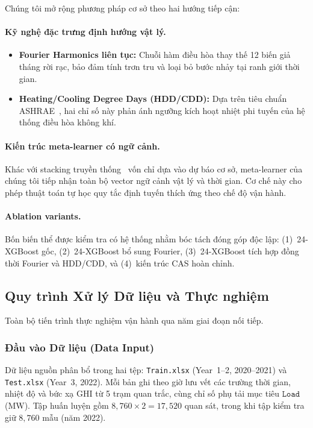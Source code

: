 Chúng tôi mở rộng phương pháp cơ sở theo hai hướng tiếp cận:

\paragraph{Kỹ nghệ đặc trưng định hướng vật lý.}
\begin{itemize}
    \item \textbf{Fourier Harmonics liên tục:} Chuỗi hàm điều hòa thay thế 12 biến giả tháng rời rạc, bảo đảm tính trơn tru và loại bỏ bước nhảy tại ranh giới thời gian.
    \item \textbf{Heating/Cooling Degree Days (HDD/CDD):} Dựa trên tiêu chuẩn ASHRAE~\cite{ashrae2021fundamentals}, hai chỉ số này phản ánh ngưỡng kích hoạt nhiệt phi tuyến của hệ thống điều hòa không khí.
\end{itemize}

\paragraph{Kiến trúc meta-learner có ngữ cảnh.}
Khác với stacking truyền thống~\cite{wolpert1992stacked} vốn chỉ dựa vào dự báo cơ sở, meta-learner của chúng tôi tiếp nhận toàn bộ vector ngữ cảnh vật lý và thời gian. Cơ chế này cho phép thuật toán tự học quy tắc định tuyến thích ứng theo chế độ vận hành.

\paragraph{Ablation variants.}
Bốn biến thể được kiểm tra có hệ thống nhằm bóc tách đóng góp độc lập: (1)~24-XGBoost gốc, (2)~24-XGBoost bổ sung Fourier, (3)~24-XGBoost tích hợp đồng thời Fourier và HDD/CDD, và (4)~kiến trúc CAS hoàn chỉnh.

\subsection{Quy trình Xử lý Dữ liệu và Thực nghiệm}
\label{subsec:pipeline}

Toàn bộ tiến trình thực nghiệm vận hành qua năm giai đoạn nối tiếp.

\subsubsection{Đầu vào Dữ liệu (Data Input)}
Dữ liệu nguồn phân bổ trong hai tệp: \texttt{Train.xlsx} (Year~1--2, 2020--2021) và \texttt{Test.xlsx} (Year~3, 2022). Mỗi bản ghi theo giờ lưu vết các trường thời gian, nhiệt độ và bức xạ GHI từ 5 trạm quan trắc, cùng chỉ số phụ tải mục tiêu $\texttt{Load}$ (MW). Tập huấn luyện gồm $8{,}760 \times 2 = 17{,}520$ quan sát, trong khi tập kiểm tra giữ $8{,}760$ mẫu (năm 2022).

